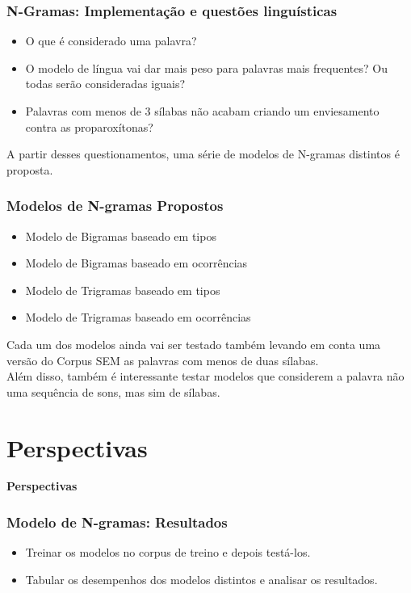 \documentclass[xcolor=table]{beamer}
\begin{document}
\begin{frame}
	\frametitle{N-Gramas: Implementação e questões linguísticas}
	\begin{itemize}
		\item O que é considerado uma palavra?\\
		\item O modelo de língua vai dar mais peso para palavras mais frequentes? Ou todas serão consideradas iguais?\\
		\item Palavras com menos de 3 sílabas não acabam criando um enviesamento contra as proparoxítonas?\\
	\end{itemize}
	A partir desses questionamentos, uma série de modelos de N-gramas distintos é proposta.
	
\end{frame}


\begin{frame}
	\frametitle{Modelos de N-gramas Propostos}
	\begin{itemize}
		\item Modelo de Bigramas baseado em tipos\\
		\item Modelo de Bigramas baseado em ocorrências\\
		\item Modelo de Trigramas baseado em tipos\\
		\item Modelo de Trigramas baseado em ocorrências\\
	\end{itemize}
	Cada um dos modelos ainda vai ser testado também levando em conta uma versão do Corpus SEM as palavras com menos de duas sílabas.\\
	Além disso, também é interessante testar modelos que considerem a palavra não uma sequência de sons, mas sim de sílabas.\\
\end{frame}


	\section{Perspectivas}
		\begin{frame}
			\centering	
			\textbf{Perspectivas}
		\end{frame}
	\begin{frame}
		\frametitle{Modelo de N-gramas: Resultados}
		\begin{itemize}
			\item Treinar os modelos no corpus de treino e depois testá-los.\\
			\item Tabular os desempenhos dos modelos distintos e analisar os resultados.\\
		\end{itemize}
	\end{frame}
	
\end{document}

